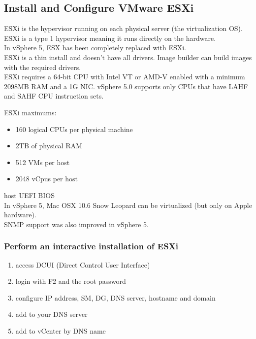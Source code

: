 \subsection{Install and Configure VMware ESXi}

ESXi is the hypervisor running on each physical server (the virtualization
OS). ESXi is a type 1 hypervisor meaning it runs directly on the hardware.\\

In vSphere 5, ESX has been completely replaced with ESXi.\\

ESXi is a thin install and doesn't have all drivers. Image builder can build
images with the required drivers.\\

ESXi requires a 64-bit CPU with Intel VT or AMD-V enabled with a minimum 2098MB RAM and a
1G NIC. vSphere 5.0 supports only CPUs that have LAHF and SAHF CPU instruction sets.

ESXi maximums:

\begin{itemize}

\item 160 logical CPUs per physical machine
\item 2TB of physical RAM
\item 512 VMs per host
\item 2048 vCpus per host

\end{itemize}

host UEFI BIOS\\

In vSphere 5, Mac OSX 10.6 Snow Leopard can be virtualized (but only on Apple
hardware).\\

SNMP support was also improved in vSphere 5.

\subsubsection{Perform an interactive installation of ESXi}

\begin{enumerate}
\item access DCUI (Direct Control User Interface)
\item login with F2 and the root password
\item configure IP address, SM, DG, DNS server, hostname and domain
\item add to your DNS server
\item add to vCenter by DNS name
\end{enumerate}

